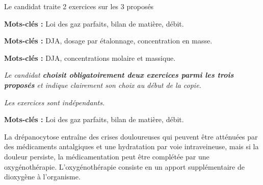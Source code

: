 
\vAligne{-50pt}

\begin{boite}
  \centering
  Le candidat traite  2 exercices sur les 3 proposés

  \begin{multicols}{3}
    \begin{boite}
      \begin{center}
      \end{center}
      \vspace*{-12pt}
      \textbf{Mots-clés :} Loi des gaz parfaits, bilan de matière, débit.
    \end{boite}
    \begin{boite}
      \begin{center}
      \end{center}
      \vspace*{-12pt}
      \textbf{Mots-clés :} DJA, dosage par étalonnage, concentration en masse.
    \end{boite}
    \begin{boite}
      \begin{center}
      \end{center}
      \vspace*{-12pt}
      \textbf{Mots-clés :} DJA, concentrations molaire et massique.
    \end{boite}
  \end{multicols}
\end{boite}

\textit{
  Le candidat \textbf{choisit obligatoirement deux exercices parmi les trois proposés} et indique clairement son choix au début de la copie.
}
  
\textit{
  Les exercices sont indépendants.
}
\vspace*{24pt}


\vspace*{-4pt}

\textbf{Mots-clés :} Loi des gaz parfaits, bilan de matière, débit.
\medskip


La drépanocytose entraîne des crises douloureuses qui peuvent être atténuées par des médicaments antalgiques et une hydratation par voie intraveineuse, mais si la douleur persiste, la médicamentation peut être complétée par une oxygénothérapie.
L’oxygénothérapie consiste en un apport supplémentaire de dioxygène à l’organisme.

